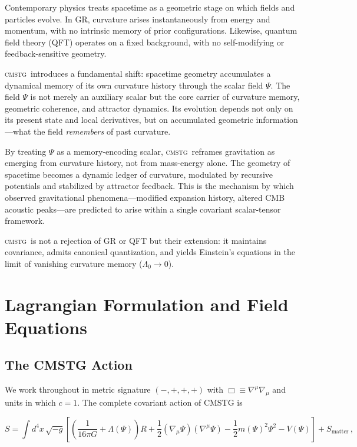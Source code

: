 \documentclass[12pt,a4paper]{article}
\newcommand{\CMSTG}{\textsc{cmstg}}
\begin{document}
Contemporary physics treats spacetime as a geometric stage on which
fields and particles evolve. In GR, curvature arises instantaneously
from energy and momentum, with no intrinsic memory of prior configurations.
Likewise, quantum field theory (QFT) operates on a fixed background,
with no self-modifying or feedback-sensitive geometry.

\CMSTG\ introduces a fundamental shift: spacetime geometry accumulates a
dynamical memory of its own curvature history through the scalar field $\Psi$.
The field $\Psi$ is not merely an auxiliary scalar but the core carrier of
curvature memory, geometric coherence, and attractor dynamics. Its evolution
depends not only on its present state and local derivatives, but on accumulated
geometric information---what the field \emph{remembers} of past curvature.

By treating $\Psi$ as a memory-encoding scalar, \CMSTG\ reframes gravitation as
emerging from curvature history, not from mass-energy alone. The geometry of
spacetime becomes a dynamic ledger of curvature, modulated by recursive potentials
and stabilized by attractor feedback. This is the mechanism by which observed
gravitational phenomena---modified expansion history, altered CMB acoustic
peaks---are predicted to arise within a single covariant scalar-tensor framework.

\CMSTG\ is not a rejection of GR or QFT but their extension: it maintains
covariance, admits canonical quantization, and yields Einstein's equations in
the limit of vanishing curvature memory ($\Lambda_0 \to 0$).

\section{Lagrangian Formulation and Field Equations}
\label{sec:lagrangian}

\subsection{The CMSTG Action}

We work throughout in metric signature $(-,+,+,+)$ with
$\Box \equiv \nabla^\mu\nabla_\mu$ and units in which $c = 1$.
The complete covariant action of CMSTG is

\begin{equation}
\label{eq:action}
S = \int d^4x\,\sqrt{-g}
\left[
  \left(\frac{1}{16\pi G} + \Lambda(\Psi)\right)R
  + \frac{1}{2}(\nabla_\mu\Psi)(\nabla^\mu\Psi)
  - \frac{1}{2}m(\Psi)^2\Psi^2
  - V(\Psi)
\right]
+ S_{\mathrm{matter}}\,,
\end{equation}
\end{document}
